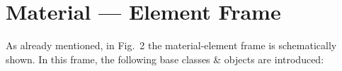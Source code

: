\documentclass[12pt,draft]{article}
\newcommand{\class}[1]{{\bf #1}}
\newcommand{\service}[1]{{\em #1}}
\begin{document}




\section{Material --- Element Frame}
\label{materialEleemntFrame}
As already mentioned, in Fig.~2 the material-element
frame is schematically shown.
In this frame, the following base classes \&
objects are introduced:
\end{document}
